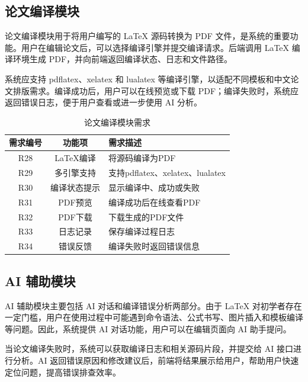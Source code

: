 \documentclass{xduugthesis}
\begin{document}
\subsection{论文编译模块}
论文编译模块用于将用户编写的 LaTeX 源码转换为 PDF 文件，是系统的重要功能。用户在编辑论文后，可以选择编译引擎并提交编译请求。后端调用 LaTeX 编译环境生成 PDF，并向前端返回编译状态、日志和文件路径。

系统应支持 pdflatex、xelatex 和 lualatex 等编译引擎，以适配不同模板和中文论文排版需求。编译成功后，用户可以在线预览或下载 PDF；编译失败时，系统应返回错误日志，便于用户查看或进一步使用 AI 分析。

\begin{table}[H]
    \centering
    \caption{论文编译模块需求}
    \label{tab:compile-requirement}
    \begin{tabular}{|c|c|p{7cm}|}
        \hline
        需求编号 & 功能项 & 需求描述 \\
        \hline
        R28 & LaTeX编译 & 将源码编译为PDF \\
        \hline
        R29 & 多引擎支持 & 支持pdflatex、xelatex、lualatex \\
        \hline
        R30 & 编译状态提示 & 显示编译中、成功或失败 \\
        \hline
        R31 & PDF预览 & 编译成功后在线查看PDF \\
        \hline
        R32 & PDF下载 & 下载生成的PDF文件 \\
        \hline
        R33 & 日志记录 & 保存编译过程日志 \\
        \hline
        R34 & 错误反馈 & 编译失败时返回错误信息 \\
        \hline
    \end{tabular}
\end{table}

\subsection{AI 辅助模块}
AI 辅助模块主要包括 AI 对话和编译错误分析两部分。由于 LaTeX 对初学者存在一定门槛，用户在使用过程中可能遇到命令语法、公式书写、图片插入和模板编译等问题。因此，系统提供 AI 对话功能，用户可以在编辑页面向 AI 助手提问。

当论文编译失败时，系统可以获取编译日志和相关源码片段，并提交给 AI 接口进行分析。AI 返回错误原因和修改建议后，前端将结果展示给用户，帮助用户快速定位问题，提高错误排查效率。
\end{document}

